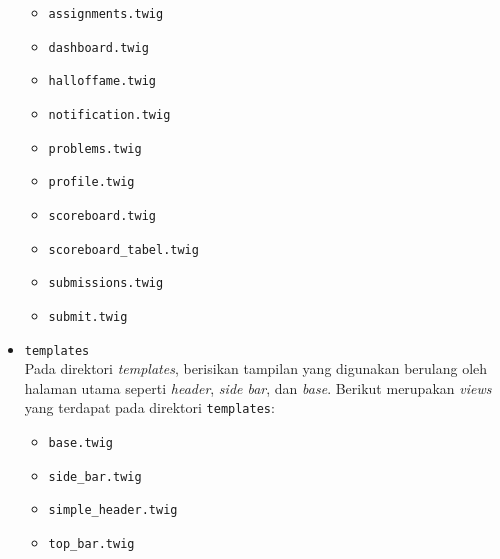 \begin{itemize}
\begin{itemize}
                  \item \verb|assignments.twig|
                  \item \verb|dashboard.twig|
                  \item \verb|halloffame.twig|
                  \item \verb|notification.twig|
                  \item \verb|problems.twig|
                  \item \verb|profile.twig|
                  \item \verb|scoreboard.twig|
                  \item \verb|scoreboard_tabel.twig|
                  \item \verb|submissions.twig|
                  \item \verb|submit.twig|
            \end{itemize}

      \item \verb|templates| \\
            Pada direktori \textit{templates}, berisikan tampilan yang digunakan berulang oleh halaman utama seperti \textit{header}, \textit{side bar}, dan \textit{base}. Berikut merupakan \textit{views} yang terdapat pada direktori \verb|templates|:

            \begin{itemize}
                  \item \verb|base.twig|
                  \item \verb|side_bar.twig|
                  \item \verb|simple_header.twig|
                  \item \verb|top_bar.twig|
            \end{itemize}

\end{itemize}

